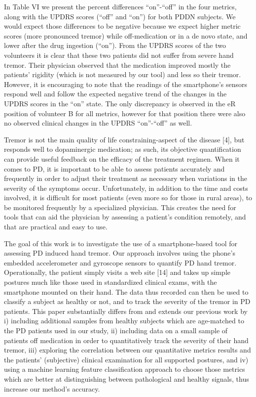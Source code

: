
In Table VI we present the percent differences “on”-“off” in the four metrics, along with the UPDRS scores (“off” and “on”) for both PDDN subjects. We would expect those differences to be negative because we expect higher metric scores (more pronounced tremor) while off-medication or in a de novo state, and lower after the drug ingestion (“on”). 
From the UPDRS scores of the two volunteers it is clear that these two patients did not suffer from severe hand tremor. Their physician observed that the medication improved mostly the patients’ rigidity (which is not measured by our tool) and less so their tremor. However, it is encouraging to note that the readings of the smartphone’s sensors respond well and follow the expected negative trend of the changes in the UPDRS scores in the “on” state. The only discrepancy is observed in the eR position of volunteer B for all metrics, however for that position there were also no observed clinical changes in the UPDRS “on”-“off” as well. 



Tremor is not the main quality of life constraining-aspect of the disease [4], but responds well to dopaminergic medication; as such, its objective quantification can provide useful feedback on the efficacy of the treatment regimen. 
When it comes to PD, it is important to be able to assess patients accurately and frequently in order to adjust their treatment as necessary when variations in the severity of the symptoms occur. Unfortunately, in addition to the time and costs involved, it is difficult for most patients (even more so for those in rural areas), to be monitored frequently by a specialized physician. This creates the need for tools that can aid the physician by assessing a patient’s condition remotely, and that are practical and easy to use. 

The goal of this work is to investigate the use of a smartphone-based tool for assessing PD induced hand tremor. Our approach involves using the phone’s embedded accelerometer and gyroscope sensors to quantify PD hand tremor. Operationally, the patient simply visits a web site [14] and takes up simple postures much like those used in standardized clinical exams, with the smartphone mounted on their hand. The data thus recorded can then be used to classify a subject as healthy or not, and to track the severity of the tremor in PD patients. 
This paper substantially differs from and extends our previous work by 
i) including additional samples from healthy subjects which are age-matched to the PD patients used in our study, 
ii) including data on a small sample of patients off medication in order to quantitatively track the severity of their hand tremor, 
iii) exploring the correlation between our quantitative metrics results and the patients’ (subjective) clinical examination for all supported postures, and 
iv) using a machine learning feature classification approach to choose those metrics which are better at distinguishing between pathological and healthy signals, thus  increase our method’s accuracy. 

